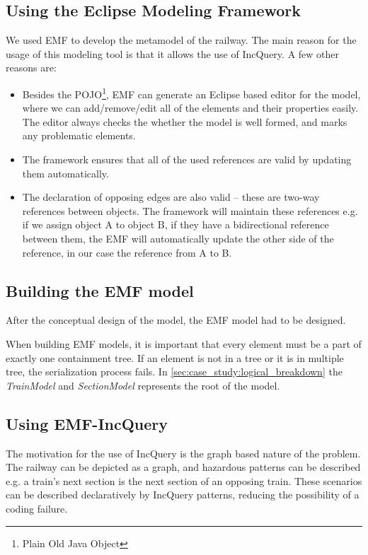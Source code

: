 \newpage

\subsection{Using the Eclipse Modeling Framework}

We used EMF to develop the metamodel of the railway. The main reason for the usage of this modeling tool is that it allows the use of IncQuery. A few other reasons are:
\begin{itemize}
	\item Besides the POJO\footnote{Plain Old Java Object}, EMF can generate an Eclipse based editor for the model, where we can add/remove/edit all of the elements and their properties easily. The editor always checks the whether the model is well formed, and marks any problematic elements.
	\item The framework ensures that all of the used references are valid by updating them automatically.
	\item The declaration of opposing edges are also valid -- these are two-way references between objects. The framework will maintain these references e.g. if we assign object A to object B, if they have a bidirectional reference between them, the EMF will automatically update the other side of the reference, in our case the reference from A to B.
\end{itemize}

\subsection{Building the EMF model}

After the conceptual design of the model, the EMF model had to be designed.

When building EMF models, it is important that every element must be a part of exactly one containment tree. If an element is not in a tree or it is in multiple tree, the serialization process fails. In \cref{sec:case_study:logical_breakdown} the \emph{TrainModel} and \emph{SectionModel} represents the root of the model.

\subsection{Using EMF-IncQuery}

The motivation for the use of IncQuery is the graph based nature of the problem. The railway can be depicted as a graph, and hazardous patterns can be described e.g. a train's next section is the next section of an opposing train. These scenarios can be described declaratively by IncQuery patterns, reducing the possibility of a coding failure. 

